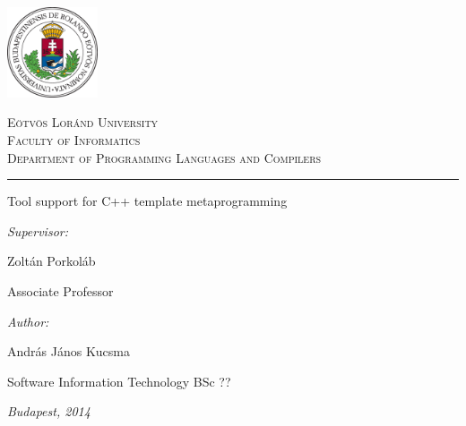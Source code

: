 \begin{titlepage}

\noindent
\parbox[m]{0.2\textwidth}{
    \includegraphics[width=0.2\textwidth]{img/elte_logo_colored.eps}
}
\hfill
\parbox[m]{0.7\textwidth}{
    \begin{center}
    \begin{large}
    \textsc{
        Eötvös Loránd University\\
        \vspace{0.5pc}
        Faculty of Informatics\\
        \vspace{0.5pc}
        Department of Programming Languages and Compilers\\
    }
    \end{large}
    \end{center}
}

\vspace{1pc}
\hrule

\vfill

\begin{center}
    {\LARGE Tool support for C++ template metaprogramming}
\end{center}

\vfill

\noindent
\hspace*{0.05\textwidth}
\parbox{0.45\textwidth}{
    {\it Supervisor:}
    \bigskip

    {\Large Zoltán Porkoláb}
    \smallskip

    Associate Professor
}
\hfill
\parbox{0.45\textwidth}{
    {\it Author:}
    \bigskip

    {\Large András János Kucsma}
    \smallskip

    Software Information Technology BSc ??
}


\vfill

\begin{center}
    {\large {\it Budapest, 2014}}
\end{center}

\end{titlepage}

